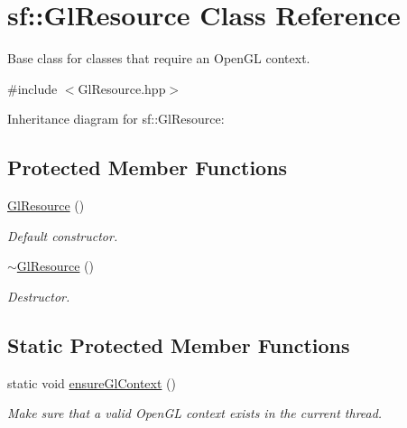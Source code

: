 \hypertarget{classsf_1_1_gl_resource}{}\section{sf\+:\+:Gl\+Resource Class Reference}
\label{classsf_1_1_gl_resource}


Base class for classes that require an Open\+GL context.  




{\ttfamily \#include $<$Gl\+Resource.\+hpp$>$}



Inheritance diagram for sf\+:\+:Gl\+Resource\+:
\subsection*{Protected Member Functions}
\begin{DoxyCompactItemize}
\item 
\mbox{\label{classsf_1_1_gl_resource_ad8fb7a0674f0f77e530dacc2a3b0dc6a}} 
\hyperlink{classsf_1_1_gl_resource_ad8fb7a0674f0f77e530dacc2a3b0dc6a}{Gl\+Resource} ()
\begin{DoxyCompactList}\small\item\em Default constructor. \end{DoxyCompactList}\item 
\mbox{\label{classsf_1_1_gl_resource_ab99035b67052331d1e8cf67abd93de98}} 
\hyperlink{classsf_1_1_gl_resource_ab99035b67052331d1e8cf67abd93de98}{$\sim$\+Gl\+Resource} ()
\begin{DoxyCompactList}\small\item\em Destructor. \end{DoxyCompactList}\end{DoxyCompactItemize}
\subsection*{Static Protected Member Functions}
\begin{DoxyCompactItemize}
\item 
\mbox{\label{classsf_1_1_gl_resource_ae0efa7935241644608ca32ba47b22a33}} 
static void \hyperlink{classsf_1_1_gl_resource_ae0efa7935241644608ca32ba47b22a33}{ensure\+Gl\+Context} ()
\begin{DoxyCompactList}\small\item\em Make sure that a valid Open\+GL context exists in the current thread. \end{DoxyCompactList}\end{DoxyCompactItemize}


